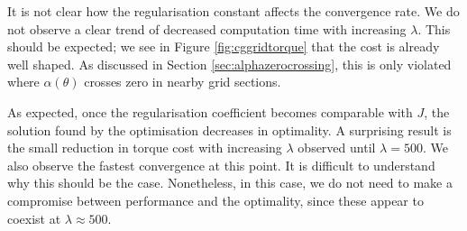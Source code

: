 It is not clear how the regularisation constant affects the convergence rate. We do not observe a clear trend of decreased computation time with increasing $\lambda$. This should be expected; we see in Figure \ref{fig:cggridtorque} that the cost is already well shaped. As discussed in Section \ref{sec:alphazerocrossing}, this is only violated where $\alpha(\theta)$ crosses zero in nearby grid sections.

As expected, once the regularisation coefficient becomes comparable with $J$, the solution found by the optimisation decreases in optimality. A surprising result is the small reduction in torque cost with increasing $\lambda$ observed until $\lambda=500$. We also observe the fastest convergence at this point. It is difficult to understand why this should be the case. Nonetheless, in this case, we do not need to make a compromise between performance and the optimality, since these appear to coexist at $\lambda\approx500$.